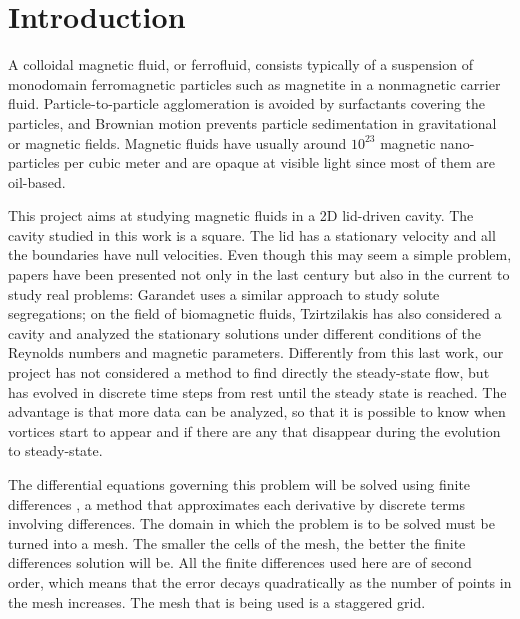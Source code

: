 \documentclass[journal]{IEEEtran}
\begin{document}
%
\IEEEpeerreviewmaketitle

\section{Introduction}
A colloidal magnetic fluid, or ferrofluid, consists typically of a suspension of monodomain ferromagnetic particles such as magnetite in a nonmagnetic carrier fluid. Particle-to-particle agglomeration is avoided by surfactants covering the particles, and Brownian motion prevents particle sedimentation in gravitational or magnetic fields\cite{RosensweigMagneticFluids}. Magnetic fluids have usually around $10^{23}$ magnetic nano-particles per cubic meter and are opaque at visible light since most of them are oil-based.

This project aims at studying magnetic fluids in a 2D lid-driven cavity. The cavity studied in this work is a square. The lid has a stationary velocity and all the boundaries have null velocities. Even though this may seem a simple problem, papers have been presented not only in the last century but also in the current to study real problems: Garandet \cite{Garandet2012149} uses a similar approach to study solute segregations; on the field of biomagnetic fluids, Tzirtzilakis \cite{Tzirtzilakis2013} has also considered a cavity and analyzed the stationary solutions under different conditions of the Reynolds numbers and magnetic parameters. Differently from this last work, our project has not considered a method to find directly the steady-state flow, but has evolved in discrete time steps from rest until the steady state is reached. The advantage is that more data can be analyzed, so that it is possible to know when vortices start to appear and if there are any that disappear during the evolution to steady-state. 

The differential equations governing this problem will be solved using finite differences \cite{zbMATH03010997}, a method that approximates each derivative by discrete terms involving differences. The domain in which the problem is to be solved must be turned into a mesh. The smaller the cells of the mesh, the better the finite differences solution will be. All the finite differences used here are of second order, which means that the error decays quadratically as the number of points in the mesh increases. The mesh that is being used is a staggered grid. 
\end{document}
